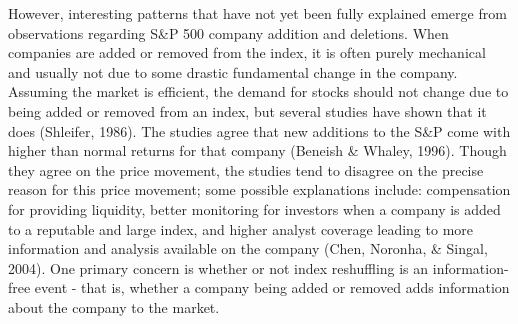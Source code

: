 \documentclass[12pt,twoside]{reedthesis}
\theoremstyle{definition}
\theoremstyle{definition}
\theoremstyle{definition}
\theoremstyle{remark}
\begin{document}
However, interesting patterns that have not yet been fully explained
emerge from observations regarding S\&P 500 company addition and
deletions. When companies are added or removed from the index, it is
often purely mechanical and usually not due to some drastic fundamental
change in the company. Assuming the market is efficient, the demand for
stocks should not change due to being added or removed from an index,
but several studies have shown that it does (Shleifer, 1986). The
studies agree that new additions to the S\&P come with higher than
normal returns for that company (Beneish \& Whaley, 1996). Though they
agree on the price movement, the studies tend to disagree on the precise
reason for this price movement; some possible explanations include:
compensation for providing liquidity, better monitoring for investors
when a company is added to a reputable and large index, and higher
analyst coverage leading to more information and analysis available on
the company (Chen, Noronha, \& Singal, 2004). One primary concern is
whether or not index reshuffling is an information-free event - that is,
whether a company being added or removed adds information about the
company to the market.
\end{document}
